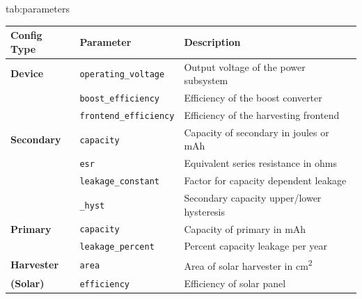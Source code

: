 \begin{definetable}{tab:parameters}
    \centering
    \begin{adjustbox}{width=\columnwidth}
    \begin{tabular}{lll}
\hline
\textbf{Config Type}& \multicolumn{1}{l}{\textbf{Parameter}}                   & \multicolumn{1}{l}{\textbf{Description}} \\ \hline
\textbf{Device}     & \texttt{operating\_voltage}                              & Output voltage of the power subsystem    \\
                    & \texttt{boost\_efficiency}                               & Efficiency of the boost converter        \\
                    & \texttt{frontend\_efficiency}                            & Efficiency of the harvesting frontend    \\ \hline
\textbf{Secondary}  & \texttt{capacity}                                        & Capacity of secondary in joules or mAh   \\
                    & \texttt{esr}                                             & Equivalent series resistance in ohms     \\
                    & \texttt{leakage\_constant}                               & Factor for capacity dependent leakage    \\
                    & \texttt{\string{max, min\string}\_hyst}                  & Secondary capacity upper/lower hysteresis\\ \hline
\textbf{Primary}    & \texttt{capacity}                                        & Capacity of primary in mAh               \\
                    & \texttt{leakage\_percent}                                & Percent capacity leakage per year        \\ \hline
        \textbf{Harvester}  & \texttt{area}                                    & Area of solar harvester in cm\textsuperscript{2}\\
\textbf{(Solar)}    & \texttt{efficiency}                                      & Efficiency of solar panel                \\ \hline

\end{tabular}
\end{adjustbox}
\end{definetable}
